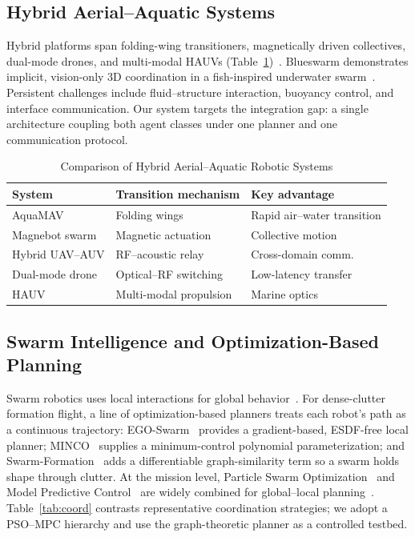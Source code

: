 \documentclass[journal]{IEEEtran}
\begin{document}
\subsection{Hybrid Aerial--Aquatic Systems}
Hybrid platforms span folding-wing transitioners, magnetically driven
collectives, dual-mode drones, and multi-modal HAUVs
(Table~\ref{tab:hybrid})~\cite{tahir2024aerial,qi2025review,kim2022swarm,zhang2023rfoptical}.
Blueswarm demonstrates implicit, vision-only 3D coordination in a fish-inspired
underwater swarm~\cite{berlinger2021implicit}. Persistent challenges include
fluid--structure interaction, buoyancy control, and interface communication. Our
system targets the integration gap: a single architecture coupling both agent
classes under one planner and one communication protocol.

\begin{table}[!t]
\centering
\caption{Comparison of Hybrid Aerial--Aquatic Robotic Systems}
\label{tab:hybrid}
\begin{tabular}{p{1.5cm}p{2.2cm}p{2.6cm}}
\toprule
System & Transition mechanism & Key advantage\\
\midrule
AquaMAV       & Folding wings        & Rapid air--water transition\\
Magnebot swarm& Magnetic actuation   & Collective motion\\
Hybrid UAV--AUV& RF--acoustic relay   & Cross-domain comm.\\
Dual-mode drone& Optical--RF switching& Low-latency transfer\\
HAUV          & Multi-modal propulsion& Marine optics\\
\bottomrule
\end{tabular}
\end{table}

\subsection{Swarm Intelligence and Optimization-Based Planning}
Swarm robotics uses local interactions for global
behavior~\cite{reynolds1987flocks}. For dense-clutter formation flight, a line of
optimization-based planners treats each robot's path as a continuous trajectory:
EGO-Swarm~\cite{zhou2021egoswarm} provides a gradient-based, ESDF-free local
planner; MINCO~\cite{wang2022geometrically} supplies a minimum-control polynomial
parameterization; and Swarm-Formation~\cite{quan2022distributed,quan2023robust}
adds a differentiable graph-similarity term so a swarm holds shape through
clutter. At the mission level, Particle Swarm
Optimization~\cite{kennedy1995particle} and Model Predictive
Control~\cite{mayne2000constrained} are widely combined for global--local
planning~\cite{cao2025path,mu2022path,liu2026improved,liu2017planning}.
Table~\ref{tab:coord} contrasts representative coordination strategies; we adopt a
PSO--MPC hierarchy and use the graph-theoretic planner as a controlled testbed.
\end{document}
